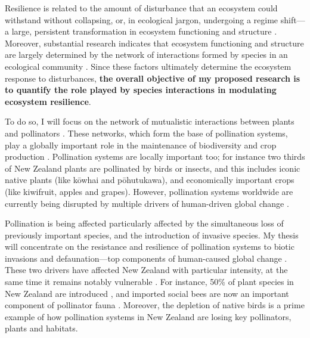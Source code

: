 \documentclass[a4paper]{report}
\begin{document}
Resilience is related to the amount of disturbance that an ecosystem could withstand without collapsing, or, in ecological jargon, undergoing a regime shift---a large, persistent transformation in ecosystem functioning and structure \citep{Holling1973, Gunderson2000}.
Moreover, substantial research indicates that ecosystem functioning and structure are largely determined by the network of interactions formed by species in an ecological community \citep{Bascompte2006, Dobson2006, Tylianakis2008, Reiss2009}.
Since these factors ultimately determine the ecosystem response to disturbances, \textbf{the overall objective of my proposed research is to quantify the role played by species interactions in modulating ecosystem resilience}.

To do so, I will focus on the network of mutualistic interactions between plants and pollinators \citep{Bascompte2006, Bascompte2007, Klein2007}.
These networks, which form the base of pollination systems, play a globally important role in the maintenance of biodiversity and crop production \citep{Bascompte2007, Klein2007}.
Pollination systems are locally important too; for instance two thirds of New Zealand plants are pollinated by birds or insects\citep{Cox2000}, and this includes iconic native plants (like k\={o}whai and p\={o}hutukawa), and economically important crops (like kiwifruit, apples and grapes). However, pollination systems worldwide are currently being disrupted by multiple drivers of human-driven global change \citep{Cox2000}.

Pollination is being affected particularly affected by the simultaneous loss of previously important species, and the introduction of invasive species.
My thesis will concentrate on the resistance and resilience of pollination systems to biotic invasions and defaunation---top components of human-caused global change .
These two drivers have affected New Zealand with particular intensity, at the same time it remains notably vulnerable \citep{Vitousek1997}.
For instance, 50\% of plant species in New Zealand are introduced \citep{Wilton2000}, and imported social bees are now an important component of pollinator fauna \citep{Lloyd1985, Newstrom2005}.
Moreover, the depletion of native birds \citep{Anderson2003, Robertson2009} is a prime example of how pollination systems in New Zealand are losing key pollinators, plants and habitats\citep{Cox2000}.
\end{document}
